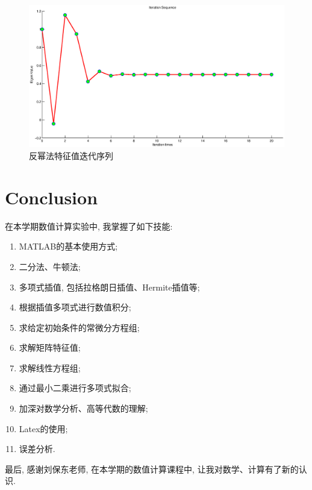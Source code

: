 \documentclass{article}
\begin{document}
\begin{CJK*}{UTF8}{song}
\begin{figure}[H]
					 	\includegraphics[width=1.0\textwidth]{../chapter_9_3.eps}
					 	\caption{反幂法特征值迭代序列}
					 	\label{img_chapter9_3}
					 \end{figure}
	\section{Conclusion}
		在本学期数值计算实验中, 我掌握了如下技能:
		\begin{enumerate}
			\item MATLAB的基本使用方式;
			\item 二分法、牛顿法;
			\item 多项式插值, 包括拉格朗日插值、Hermite插值等;
			\item 根据插值多项式进行数值积分;
			\item 求给定初始条件的常微分方程组;
			\item 求解矩阵特征值;
			\item 求解线性方程组;
			\item 通过最小二乘进行多项式拟合;
			\item 加深对数学分析、高等代数的理解;
			\item Latex的使用;
			\item 误差分析.
		\end{enumerate}
		最后, 感谢刘保东老师, 在本学期的数值计算课程中, 让我对数学、计算有了新的认识.
\end{CJK*}
\end{document}
